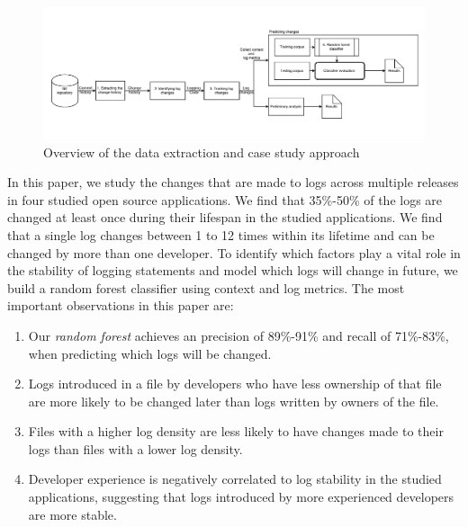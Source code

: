
\begin{figure}
	\centering
	\includegraphics[width=1\textwidth,
	height=.4\textwidth]{LogGenalogyMethdology}
	\caption{Overview of the data extraction and case study approach}
	\label{fig:LGmethod}
\end{figure}


In this paper, we study the changes that are made to logs across multiple releases in four studied open source applications. We find that 35\%-50\% of the logs are changed at least once during their lifespan in the studied applications. We find that a single log changes between 1 to 12 times within its lifetime and can be changed by more than one developer. To identify which factors play a vital role in the stability of logging statements and model which logs will change in future, we build a random forest classifier using context and log metrics. The most important observations in this paper are:
\begin{enumerate}
	\item  Our \textsl{random forest} achieves an precision of 89\%-91\% and recall of 71\%-83\%, when predicting which logs will be changed.
	\item Logs introduced in a file by developers who have less ownership of that file are more likely to be changed later than logs written by owners of the file. 
	\item Files with a higher log density are less likely to have changes made to their logs than files with a lower log density.
	\item Developer experience is negatively correlated to log stability in the studied applications, suggesting that logs introduced by more experienced developers are more stable. 

\end{enumerate}



